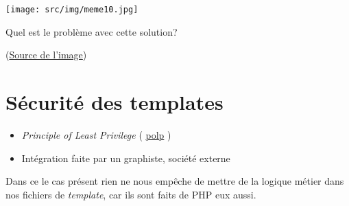 \begin{otherlanguage}{english}

\begin{Shaded}
\begin{Highlighting}[]
 


 \OtherTok{;}

 \OtherTok{(}\NormalTok{ === }\OtherTok{[}\OtherTok{])}\NormalTok{ \{}
     \OtherTok{;}
\NormalTok{\} }\NormalTok{ \{}
     \OtherTok{;}
\NormalTok{\}}
\end{Highlighting}
\end{Shaded}

\end{otherlanguage}

\texttt{[image: src/img/meme10.jpg]}

Quel est le problème avec cette solution?

(\href{https://raw.githubusercontent.com/cyrilmanuel/picbot/e6ff24a8bfd7ee9f0514a4fd8f49b1255ef26178/picbot/Images/meme10.jpg}{Source
de l'image})

\hypertarget{suxe9curituxe9-des-templates}{%
\section{Sécurité des templates}\label{suxe9curituxe9-des-templates}}

\begin{itemize}
\tightlist
\item
  \emph{Principle of Least Privilege} (
  \href{https://en.wikipedia.org/wiki/Principle_of_least_privilege}{polp}
  )
\item
  Intégration faite par un graphiste, société externe
\end{itemize}

Dans ce le cas présent rien ne nous empêche de mettre de la logique
métier dans nos fichiers de \emph{template}, car ils sont faits de PHP
eux aussi.

